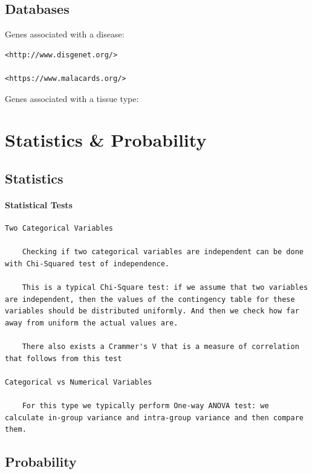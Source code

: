 \documentclass[
]{book}
\begin{document}
\hypertarget{databases}{%
\section{Databases}\label{databases}}

Genes associated with a disease:

\begin{verbatim}
<http://www.disgenet.org/>

<https://www.malacards.org/>
\end{verbatim}

Genes associated with a tissue type:

\hypertarget{statistics-probability}{%
\chapter{Statistics \& Probability}\label{statistics-probability}}

\hypertarget{statistics}{%
\section{Statistics}\label{statistics}}

\hypertarget{statistical-tests}{%
\subsubsection{Statistical Tests}\label{statistical-tests}}

\begin{verbatim}
Two Categorical Variables

    Checking if two categorical variables are independent can be done with Chi-Squared test of independence.

    This is a typical Chi-Square test: if we assume that two variables are independent, then the values of the contingency table for these variables should be distributed uniformly. And then we check how far away from uniform the actual values are.

    There also exists a Crammer's V that is a measure of correlation that follows from this test

Categorical vs Numerical Variables

    For this type we typically perform One-way ANOVA test: we calculate in-group variance and intra-group variance and then compare them.
\end{verbatim}

\hypertarget{probability}{%
\section{Probability}\label{probability}}
\end{document}
